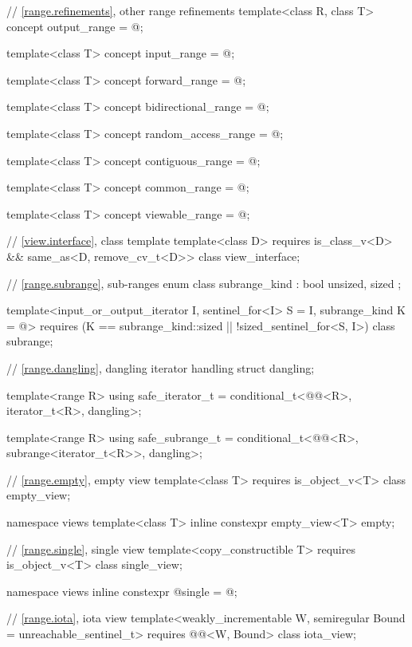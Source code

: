 \documentclass{wg21}
\begin{document}
\begin{codeblock}
{	// \ref{range.refinements}, other range refinements
	template<class R, class T>
	concept output_range = @\seebelow@;
	
	template<class T>
	concept input_range = @\seebelow@;
	
	template<class T>
	concept forward_range = @\seebelow@;
	
	template<class T>
	concept bidirectional_range = @\seebelow@;
	
	template<class T>
	concept random_access_range = @\seebelow@;
	
	template<class T>
	concept contiguous_range = @\seebelow@;
	
	template<class T>
	concept common_range = @\seebelow@;
	
	template<class T>
	concept viewable_range = @\seebelow@;
	
	// \ref{view.interface}, class template 
	template<class D>
	requires is_class_v<D> && same_as<D, remove_cv_t<D>>
	class view_interface;
	
	// \ref{range.subrange}, sub-ranges
	enum class subrange_kind : bool { unsized, sized };
	
	template<input_or_output_iterator I, sentinel_for<I> S = I, subrange_kind K = @\seebelow@>
	requires (K == subrange_kind::sized || !sized_sentinel_for<S, I>)
	class subrange;
	
	// \ref{range.dangling}, dangling iterator handling
	struct dangling;
	
	template<range R>
	using safe_iterator_t = conditional_t<@@<R>, iterator_t<R>, dangling>;
	
	template<range R>
	using safe_subrange_t =
	conditional_t<@@<R>, subrange<iterator_t<R>>, dangling>;
	
	// \ref{range.empty}, empty view
	template<class T>
	requires is_object_v<T>
	class empty_view;
	
	namespace views {
		template<class T>
		inline constexpr empty_view<T> empty{};
	}
	
	// \ref{range.single}, single view
	template<copy_constructible T>
	requires is_object_v<T>
	class single_view;
	
	namespace views { inline constexpr @\unspec@ single = @\unspec@; }
	
	// \ref{range.iota}, iota view
	template<weakly_incrementable W, semiregular Bound = unreachable_sentinel_t>
	requires @@<W, Bound>
	class iota_view;
	
}
\end{codeblock}
\end{document}
